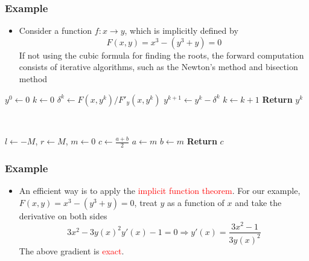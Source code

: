 \documentclass{beamer}
\begin{document}
\begin{frame}
	\frametitle{Example}

	\begin{itemize}
		\item Consider a function $f:x\rightarrow y$, which is implicitly defined by
		      $$F(x,y) = x^3 - (y^3+y) = 0$$
		      If not using the cubic formula for finding the roots, the forward computation consists of iterative algorithms, such as the Newton's method and bisection method
	\end{itemize}



	\begin{minipage}[t]{0.48\textwidth}
		\centering
		\begin{algorithmic}
			\State $y^0 \gets 0$
			\State $k \gets 0$
			\State $\delta^k \gets F(x, y^k)/F'_y(x,y^k)$
			\State $y^{k+1}\gets y^k - \delta^k$
			\State $k \gets k+1$
			\EndWhile
			\State \textbf{Return} $y^k$
		\end{algorithmic}
	\end{minipage}~
	\begin{minipage}[t]{0.48\textwidth}
		\centering
		\begin{algorithmic}
			\State $l \gets -M$, $r\gets M$, $m\gets 0$
			\While {$|F(x, m)|>\epsilon$}
			\State $c \gets \frac{a+b}{2}$
			\If{$F(x, m)>0$}
			\State $a\gets m$
			\Else
			\State $b\gets m$
			\EndIf
			\EndWhile
			\State \textbf{Return} $c$
		\end{algorithmic}

	\end{minipage}

\end{frame}

\begin{frame}
	\frametitle{Example}

	\begin{itemize}
		\item An efficient way is to apply the \textcolor{red}{implicit function theorem}. For our example, $F(x,y)=x^3-(y^3+y)=0$, treat $y$ as a function of $x$ and take the derivative on both sides
		      $$3x^2 - 3y(x)^2y'(x)-1=0\Rightarrow y'(x) = \frac{3x^2-1}{3y(x)^2}$$
		      The above gradient is \textcolor{red}{exact}.
	\end{itemize}

\end{frame}
\end{document}
